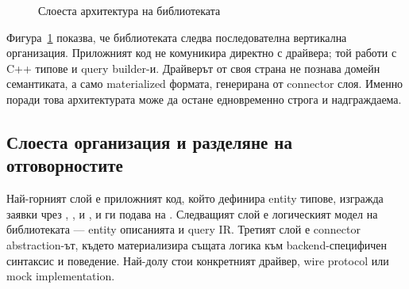 \begin{figure}[H]
\centering
{}
\caption{Слоеста архитектура на библиотеката}
\label{fig:architecture_layers}
\end{figure}

Фигура~\ref{fig:architecture_layers} показва, че библиотеката следва последователна вертикална организация. Приложният код не комуникира директно с драйвера; той работи с C++ типове и query builder-и. Драйверът от своя страна не познава домейн семантиката, а само materialized формата, генерирана от connector слоя. Именно поради това архитектурата може да остане едновременно строга и надграждаема.

\subsection{Слоеста организация и разделяне на отговорностите}

Най-горният слой е приложният код, който дефинира entity типове, изгражда заявки чрез , ,  и , и ги подава на . Следващият слой е логическият модел на библиотеката --- entity описанията и query IR. Третият слой е connector abstraction-ът, където  материализира същата логика към backend-специфичен синтаксис и поведение. Най-долу стои конкретният драйвер, wire protocol или mock implementation.

